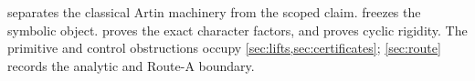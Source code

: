  separates the classical Artin machinery from the scoped
claim.   freezes the symbolic object.
 proves the exact character factors, and
 proves cyclic rigidity.  The primitive and control
obstructions occupy \cref{sec:lifts,sec:certificates};
\cref{sec:route} records the analytic and Route-A boundary.
